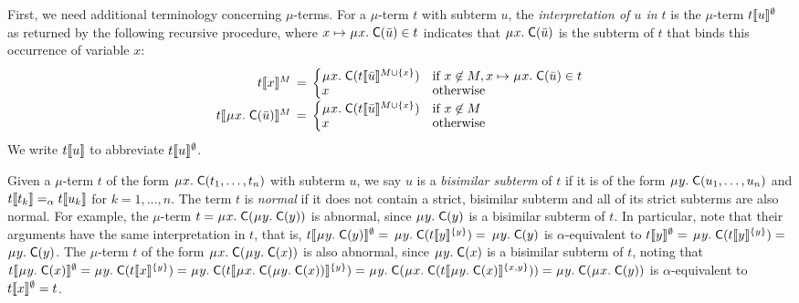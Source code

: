 First, we need additional terminology concerning $\mu$-terms.
For a $\mu$-term $t$ with subterm $u$,
the \emph{interpretation of\/ $u$ in\/ $t$} is the $\mu$-term $t\llbracket u \rrbracket^\emptyset$ as returned by the following recursive procedure,
where $x \mapsto \MU x.\; \const{C}( \vec u ) \in t$ indicates that $\MU x.\; \const{C}( \vec u )$ is the subterm of $t$ that binds this occurrence of variable $x$:
\[\begin{array}{r@{}c@{}l}
t\interp{x}^M & {} \,=\, {} &
\textstyle\begin{cases}
    \MU x.\; \const{C}( t\interp{ \vec u}^{M \mathrel\cup \{ x \}}) & \text{if }x \not\in M, x \mapsto \MU x.\; \const{C}( \vec u ) \in t  \\[-\jot]
    x & \text{otherwise}
\end{cases} \\
t\interp{\MU x.\; \const{C}( \vec u )}^M & = &
\textstyle\begin{cases}
    \MU x.\; \const{C}( t\interp{ \vec u }^{M \mathrel\cup \{ x \}} ) & \text{if }x \not\in M \\[-\jot]
    x & \text{otherwise}
\end{cases}
\end{array}\]
We write $t\llbracket u \rrbracket$ to abbreviate $t\llbracket u \rrbracket^\emptyset$.

Given a $\mu$-term $t$ of the form $\MU x.\; \const{C}( t_1, \ldots, t_n )$ with subterm $u$,
we say $u$ is a \emph{bisimilar subterm} of $t$ if it is of the form
$\MU y.\; \const{C}( u_1, \ldots, u_n )$ and $t\llbracket  t_k  \rrbracket \mathrel{=_\alpha} t\llbracket  u_k  \rrbracket$ for $k = 1,\ldots, n$.
The term $t$ is \emph{normal} if it does not contain a strict, bisimilar subterm
and all of its strict subterms are also normal.
For example, the $\mu$-term $t = \MU x.\; \const{C}( \MU y.\; \const{C}( y ) )$ is abnormal,
since $\MU y.\; \const{C}( y )$ is a bisimilar subterm of $t$.
In particular, note that their arguments have the same interpretation in $t$,
that is,
$t\interp{\MU y.\; \const{C}( y )}^\emptyset =$
$\MU y.\; \const{C}( t\interp{y}^{\{y\}} ) =$
$\MU y.\; \const{C}( y )$
is $\alpha$-equivalent to
$t\llbracket y \rrbracket^\emptyset =$
$\MU y.\; \const{C}( t\interp{y}^{\{y\}} ) =$
$\MU y.\; \const{C}( y )$.
The $\mu$-term $t$ of the form $\MU x.\; \const{C}( \MU y.\; \const{C}( x ) )$ is also abnormal,
since $\MU y.\; \const{C}( x )$ is a bisimilar subterm of $t$,
noting that
$t\interp{\MU y.\; \const{C}( x )}^\emptyset =
\MU y.\; \const{C}( t\interp{x}^{\{y\}} ) =
\MU y.\; \const{C}( t\interp{\MU x.\; \const{C}( \MU y.\; \const{C}( x ) ) }^{\{y\}} ) =
\MU y.\; \const{C}( \MU x.\; \const{C}( t\interp{\MU y.\; \const{C}( x )}^{\{x,y\}} ) ) =
\MU y.\allowbreak\; \const{C}( \MU x.\; \const{C}( y ) )$
is $\alpha$-equivalent to $t\llbracket x \rrbracket^\emptyset = t$.

